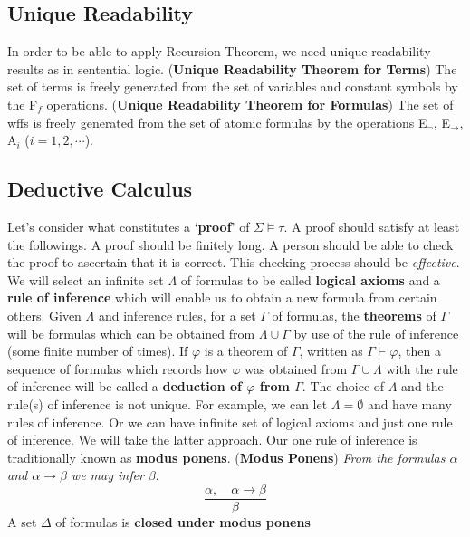 \documentclass{myproc}
\def\EE{\mbox{\eufm{}E}}
\begin{document}
	\eit
\eit

\subsection{Unique Readability}
\bit
\w In order to be able to apply Recursion Theorem, we need unique
	readability results as in sentential logic.
\w ({\bf{}Unique Readability Theorem for Terms}) 
	The set of terms is freely generated from the set of variables 
	and constant symbols by the {\eufm{}F}$_f$ operations.
\w ({\bf{}Unique Readability Theorem for Formulas}) 
	The set of wffs is freely generated from the set of atomic formulas
	by the operations \EE$_\neg$, \EE$_\rightarrow$, 
	{\eufm{}A}$_i$ ($i = 1, 2, \cdots$).
\eit

\subsection{Deductive Calculus}
\bit
\w Let's consider what constitutes a `{\bf{}proof}' of $\Sigma \models 
	\tau$. A proof should satisfy at least the followings.
	\ben
	\w [(a)] A proof should be finitely long. 
	\w [(b)] A person should be able to check the proof to ascertain
		that it is correct. This checking process should be 
		{\em{}effective\/}.
	\een
\w We will select an infinite set $\Lambda$ of formulas to be
	called {\bf{}logical axioms} and a {\bf{}rule of inference} which
	will enable us to obtain a new formula from certain others.
\w Given $\Lambda$ and inference rules, for a set $\Gamma$ of
	formulas, the {\bf{}theorems} of $\Gamma$ will be formulas
	which can be obtained from $\Lambda \cup \Gamma$ by use
	of the rule of inference (some finite number of times).
\w If $\varphi$ is a theorem of $\Gamma$, written as 
	$\Gamma \vdash \varphi$, then a sequence of formulas which
	records how $\varphi$ was obtained from $\Gamma \cup \Lambda$
	with the rule of inference will be called a {\bf{}deduction of
	$\varphi$ from $\Gamma$}.
	\bit
	\w The choice of $\Lambda$ and the rule(s) of inference is not
		unique. For example, we can let $\Lambda = \emptyset$ and
		have many rules of inference. Or we can have infinite set
		of logical axioms and just one rule of inference.
	\w We will take the latter approach.
	\eit
\w Our one rule of inference is traditionally known as
	{\bf{}modus ponens}.
\w ({\bf{}Modus Ponens}) {\em{}From the formulas $\alpha$ and 
	$\alpha \rightarrow \beta$ we may infer $\beta$}.
		\[ \frac{\alpha,\quad \alpha \rightarrow \beta}{\beta} \]
\w A set $\Delta$ of formulas is {\bf{}closed under modus ponens}
\end{document}
